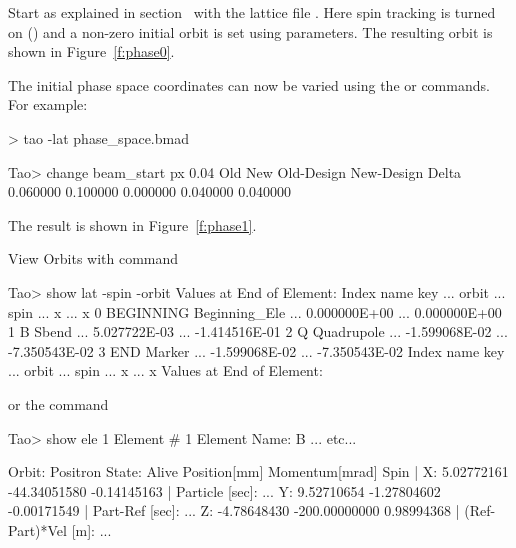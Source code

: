 \documentclass{hitec}
\begin{document}
Start \tao as explained in section~ with the lattice file . Here
spin tracking is turned on () and a non-zero initial orbit is set
using  parameters. The resulting orbit is shown in Figure~\ref{f:phase0}.

The initial phase space coordinates can now be varied using the  or 
commands. For example:
\begin{code}
> tao -lat phase_space.bmad

Tao> change beam_start px 0.04
           Old           New    Old-Design    New-Design         Delta
      0.060000      0.100000      0.000000      0.040000      0.040000  
\end{code}

The result is shown in Figure~\ref{f:phase1}. 

View Orbits with  command

\begin{code}
Tao> show lat -spin -orbit
      Values at End of Element:
 Index  name      key           ...           orbit  ...          spin 
                                ...               x  ...             x 
     0  BEGINNING Beginning_Ele ...    0.000000E+00  ...  0.000000E+00 
     1  B         Sbend         ...    5.027722E-03  ... -1.414516E-01 
     2  Q         Quadrupole    ...   -1.599068E-02  ... -7.350543E-02 
     3  END       Marker        ...   -1.599068E-02  ... -7.350543E-02 
 Index  name      key           ...           orbit  ...          spin 
                                ...               x  ...             x 
      Values at End of Element:
\end{code}

or the  command

\begin{code}
Tao> show ele 1
 Element #                1
 Element Name: B
... etc...

Orbit:  Positron   State: Alive
         Position[mm] Momentum[mrad]        Spin   |
  X:       5.02772161   -44.34051580  -0.14145163  | Particle [sec]:     ...
  Y:       9.52710654    -1.27804602  -0.00171549  | Part-Ref [sec]:     ...
  Z:      -4.78648430  -200.00000000   0.98994368  | (Ref-Part)*Vel [m]: ...
\end{code}



\newpage

\end{document}
